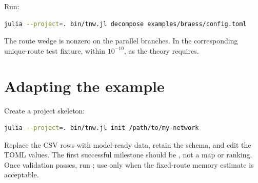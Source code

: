 Run:
\begin{lstlisting}[language=bash]
julia --project=. bin/tnw.jl decompose examples/braess/config.toml
\end{lstlisting}
The route wedge is nonzero on the parallel branches. In the corresponding
unique-route test fixture,  within \(10^{-10}\), as the theory
requires.

\section{Adapting the example}

Create a project skeleton:
\begin{lstlisting}[language=bash]
julia --project=. bin/tnw.jl init /path/to/my-network
\end{lstlisting}
Replace the CSV rows with model-ready data, retain the schema, and edit the
TOML values. The first successful milestone should be , not a
map or ranking. Once validation passes, run ; use
 only when the fixed-route memory estimate is acceptable.
